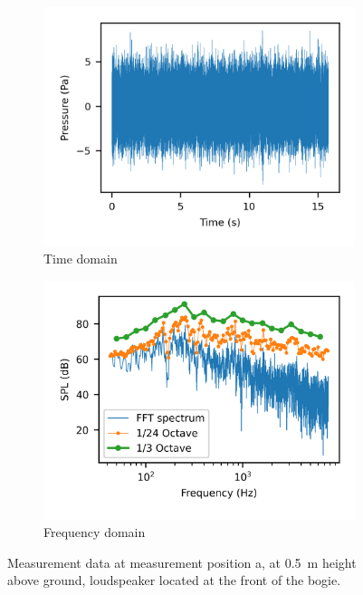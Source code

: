 \begin{figure}[H]
    \centering
    \begin{subfigure}[b]{0.48\textwidth}
        \centering
        \includegraphics{fig/time_signal.png}
        \caption{Time domain}
        \label{fig:timedomain}
    \end{subfigure}
    \begin{subfigure}[b]{0.48\textwidth}
        \centering
        \includegraphics{fig/fft_spectra.png}
        \caption{Frequency domain}
        \label{fig:frequencydomain}
    \end{subfigure}
    
    \caption{Measurement data at measurement position a, at \SI{0.5}{\meter} height above ground, loudspeaker located at the front of the bogie.}
    \label{fig:measurementsignal}
\end{figure}

